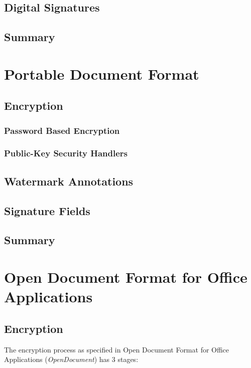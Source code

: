 \documentclass[11pt,oneside]{fithesis2}
\begin{document}
\section{Digital Signatures}\label{data_integrity}

\section{Summary}

\chapter{Portable Document Format}

\section{Encryption}

\subsection{Password Based Encryption}

\subsection{Public-Key Security Handlers}

\section{Watermark Annotations}

\section{Signature Fields}

\section{Summary}

\chapter{Open Document Format for Office Applications}

\section{Encryption}

The encryption process as specified in Open Document Format for Office Applications (\textit{OpenDocument}) \cite{odt_spec} has 3 stages:
\end{document}

